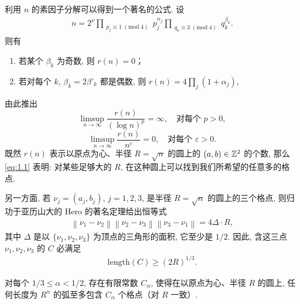 利用 $n$ 的素因子分解可以得到一个著名的公式. 设
\begin{align*}
  n=2^{\nu}\prod_{\substack{p_{j}\equiv 1\;(\mathrm{mod}\;4)}}p_{j}^{\alpha_{j}}
  \prod_{\substack{q_{k}\equiv 3\;(\mathrm{mod}\;4)}}q_{k}^{\beta_{k}}.
\end{align*}
则有
\begin{enumerate}
\item[(i)] 若某个 $\beta_k$ 为奇数, 则 $r(n) = 0$；
\item[(ii)] 若对每个 $k$, $\beta_k = 2\beta'_k$ 都是偶数, 则 $r(n) = 4 \prod_j (1 + \alpha_j)$,
\end{enumerate}
由此推出
\begin{equation}\label{eq:1.1}
  \limsup_{n\to\infty}\frac{r(n)}{(\log n)^{p}}=\infty,\quad\text{对每个 } p>0,
\end{equation}
\begin{equation}\label{eq:1.2}
  \limsup_{n\to\infty}\frac{r(n)}{n^\varepsilon}=0,\quad\text{对每个 } \varepsilon>0.
\end{equation}
既然 $r(n)$ 表示以原点为心、半径 $R = \sqrt{n}$ 的圆上的 $(a,b) \in \mathbb{Z}^2$ 的个数, 那么 \eqref{eq:1.1} 表明: 对某些足够大的 $R$, 在这种圆上可以找到我们所希望的任意多的格点.

另一方面, 若 $\nu_j = (a_j, b_j)$, $j = 1, 2, 3$, 是半径 $R = \sqrt{n}$ 的圆上的三个格点, 则归功于亚历山大的 Hero 的著名定理给出恒等式
\begin{align*}
  \left\|\nu_{1}-\nu_{2}\right\|\left\|\nu_{2}-\nu_{3}\right\|\left\|\nu_{3}-\nu_{1}\right\|=4\Delta\cdot R,
\end{align*}
其中 $\Delta$ 是以 $\{\nu_1, \nu_2, \nu_3\}$ 为顶点的三角形的面积, 它至少是 $1/2$. 因此, 含这三点 $\nu_1, \nu_2, \nu_3$ 的 $C$ 必满足
\begin{align*}
  \mathrm{length}(C)\geq(2R)^{1/3}.
\end{align*}

\begin{theorem}\label{thm:1.9}
对每个 $1/3 \leq \alpha < 1/2$, 存在有限常数 $C_\alpha$, 使得在以原点为心、半径 $R$ 的圆上, 任何长度为 $R^\alpha$ 的弧至多包含 $C_\alpha$ 个格点（对 $R$ 一致）.
\end{theorem}

